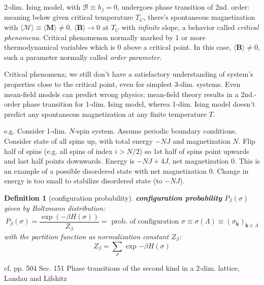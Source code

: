 \documentclass[10pt]{amsart}
\newtheorem{definition}{Definition}
\begin{document}
\begin{multicols*}{2}
2-dim. Ising model, with $\mathcal{B} \equiv h_j =0$, undergoes phase transition of 2nd. order: meaning below given critical temperature $T_C$, there's spontaneous magnetization with $\langle \mathcal{M} \rangle \equiv \langle \mathbf{M} \rangle \neq 0$.  $\langle \mathbf{B} \rangle \to 0$ at $T_C$ with \emph{infinite} slope, a behavior called \emph{critical phenomena}.  Critical phenomenon normally marked by 1 or more thermodynamical variables which is 0 above a critical point.  In this case, $\langle \mathbf{B} \rangle \neq 0$, such a parameter normally called \emph{order parameter}.  

Critical phenomena; we still don't have a satisfactory understanding of system's properties close to the critical point, even for simplest 3-dim. systems.  Even mean-field models can predict wrong physics; mean-field theory results in a 2nd.-order phase transition for 1-dim. Ising model, wherea 1-dim. Ising model doesn't predict any spontaneous magnetization at any finite temperature $T$.  

e.g. Consider 1-dim. $N$-spin system.  Assume periodic boundary conditions.  Consider state of all spins up, with total energy $-NJ$ and magnetization $N$.  Flip half of spins (e.g. all spins of index $i>N/2$) so 1st half of spins point upwards and last half points downwards.  Energy is $-NJ + 4J$, net magnetization $0$.  This is an example of a possible disordered state with net magnetization $0$.  Change in energy is too small to stabilize disordered state (to $-NJ$).  

\begin{definition}[configuration probability]
\textbf{configuration probability} $P_{\beta}(\sigma)$ given by Boltzmann distribution:  
\begin{equation}\label{Eq:Isingconfigprob}
 P_{\beta}(\sigma) = \frac{ \exp{ (-\beta H(\sigma))} }{ Z_{\beta} } = \text{ prob. of configuration } \sigma \equiv \sigma(\Lambda) \equiv (\sigma_{\mathbf{k}})_{\mathbf{k} \in \Lambda}
\end{equation} with the partition function as normalization constant $Z_{\beta}$: 
\begin{equation}\label{Eq:IsingPartitionFuncZ}
Z_{\beta} = \sum_{\sigma} \exp{ -\beta H(\sigma)}
\end{equation}
\end{definition}  



cf. pp. 504 Sec. 151 Phase transitions of the second kind in a 2-dim. lattice,  Landau and Lifshitz \cite{LaLi1980}



\end{multicols*}
\end{document}
